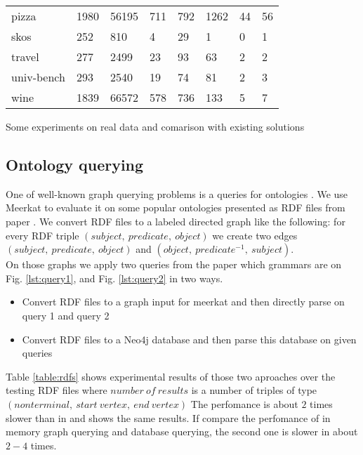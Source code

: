 \begin{table*}[t]
\begin{tabular}{|l|l|lll|lll|}
pizza                       & 1980 & 56195 & 711 & 792 & 1262 & 44 & 56 \\
skos                        & 252  & 810   & 4   & 29  & 1    & 0  & 1  \\
travel                      & 277  & 2499  & 23  & 93  & 63   & 2  & 2  \\
univ-bench                  & 293  & 2540  & 19  & 74  & 81   & 2  & 3  \\
wine                        & 1839 & 66572 & 578 & 736 & 133  & 5  & 7  \\
\hline
\end{tabular}
\caption{Evaluation results for In Memory Graph and Graph DB}
\label{table:rdfs}
\end{table*}

Some experiments on real data and comarison with existing solutions

\subsection{Ontology querying}

One of well-known graph querying problems is a queries for ontologies \cite{FndDB}. We use Meerkat to evaluate
it on some popular ontologies presented as RDF files from paper \cite{CFGonRDF}. We convert RDF files to a labeled directed graph like the following: for every RDF triple $(subject,\ predicate,\ object)$ we create two edges $(subject,\ predicate,\ object)$ and $(object,\ predicate^{-1},\ subject)$.\\
On those graphs we apply two queries from the paper \cite{GrigorevR16} which grammars are on Fig. \ref{lst:query1}, and Fig. \ref{lst:query2} in two ways.
\begin{itemize}
    \item Convert RDF files to a graph input for meerkat and then directly parse on query 1 and query 2
    \item Convert RDF files to a Neo4j database and then parse this database on given queries
\end{itemize} 
Table \ref{table:rdfs} shows experimental results of those two aproaches over the testing RDF files where $number\ of\ results$ is a number of triples of type $(nonterminal,\ start\ vertex,\ end\ vertex)$
The perfomance is about $2$ times slower than in \cite{GrigorevR16} and shows the same results. If compare the perfomance of in memory graph querying and database querying, the second one is slower in about $2-4$ times.




